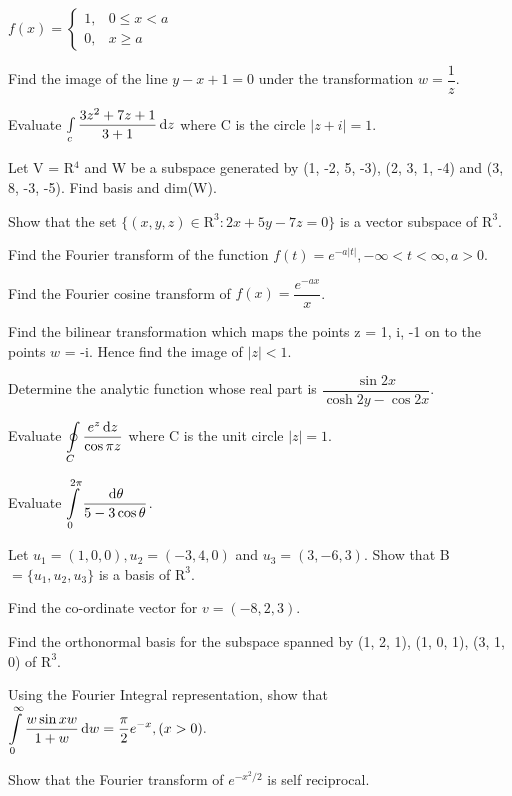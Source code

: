   $f(x) = 
  \begin{cases}
    1, & 0 \leq x < a\\
    0, & x \geq a
  \end{cases}$

\markA
\partB

\item Find the image of the line $y - x + 1 = 0$ under the transformation $w =\dfrac{1}{z}$.
\item Evaluate $\int\limits_c \dfrac{3z^2 + 7z + 1}{3 + 1} \,\mathrm{d} z$ where C is the circle $|z + i| = 1$.
\item Let V = R$^4$ and W be a subspace generated by (1, -2, 5, -3), (2, 3, 1, -4) and (3, 8, -3, -5).
  Find basis and dim(W).
\item Show that the set $\{(x, y, z) \in \mathrm{R}^3 : 2x + 5y - 7z = 0\}$ is a vector subspace
  of $\mathrm{R}^3$.
\item Find the Fourier transform of the function $f(t) = e^{-a|t|}, -\infty < t < \infty, a>0.$
\item Find the Fourier cosine transform of $f(x) = \dfrac{e^{-ax}}{x}$.

\markB

\newpage \again

\partC

\item \iitem Find the bilinear transformation which maps the points z = 1, i, -1 on to the points $w$ = -i.
  Hence find the image of $|z| < 1$.
\Or
\item Determine the analytic function whose real part is $\dfrac{\sin 2x}{\cosh 2y - \cos 2x}$.
\ene

\item \iitem Evaluate $\displaystyle\oint\limits_C \dfrac{e^z \,\mathrm{d} z}{\cos \pi z}$ where C is
  the unit circle $|z| = 1$.
\Or
\item Evaluate $\displaystyle \int\limits_0^{2\pi} \dfrac{\,\mathrm{d} \theta}{5 - 3 \cos \theta}$.
\ene

\item \iitem Let $u_1 = (1, 0, 0), u_2 = (-3, 4, 0)$ and $u_3 = (3, -6, 3)$.
\iitem Show that B $= \{u_1, u_2, u_3\}$ is a basis of $\mathrm{R}^3$.
\item Find the co-ordinate vector for $v = (-8, 2, 3).$
\ene 
\Or
\item Find the orthonormal basis for the subspace spanned by (1, 2, 1), (1, 0, 1), (3, 1, 0) of $\mathrm{R}^3$.
\ene

\item \iitem Using the Fourier Integral representation, show that $\displaystyle \int\limits_0^\infty
  \dfrac{w \sin x w}{1 + w} \,\mathrm{d} w = \dfrac{\pi}{2} e^{-x}, (x>0).$
\Or
\item Show that the Fourier transform of $e^{{-x^2}/2}$ is self reciprocal. 
\ene

\markC
\ene
